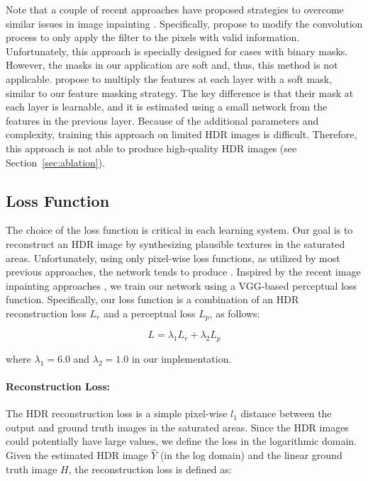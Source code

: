 Note that a couple of recent approaches have proposed strategies to overcome similar issues in image inpainting \cite{yu2018free, liu2018image}. Specifically, \citet{liu2018image} propose to modify the convolution process to only apply the filter to the pixels with valid information. Unfortunately, this approach is specially designed for cases with binary masks. However, the masks in our application are soft and, thus, this method is not applicable. \citet{yu2018free} propose to multiply the features at each layer with a soft mask, similar to our feature masking strategy. The key difference is that their mask at each layer is learnable, and it is estimated using a small network from the features in the previous layer. Because of the additional parameters and complexity, training this approach on limited HDR images is difficult. Therefore, this approach is not able to produce high-quality HDR images (see Section~\ref{sec:ablation}).

\subsection{Loss Function}
\label{sec:hybridloss}

The choice of the loss function is critical in each learning system. Our goal is to reconstruct an HDR image by synthesizing plausible textures in the saturated areas. Unfortunately, using only pixel-wise loss functions, as utilized by most previous approaches, the network tends to produce . Inspired by the recent image inpainting approaches \cite{yang2017high, liu2018image, han2019finet}, we train our network using a VGG-based perceptual loss function. Specifically, our loss function is a combination of an HDR reconstruction loss $ {L}_{r} $ and a perceptual loss $ {L}_{p} $, as follows:

\vspace{-6pt}
\begin{equation}
    \label{eqn:fullloss}
      L = {\lambda}_1 {L}_{r} + {\lambda}_2 {L}_{p}
\end{equation}
\vspace{-10pt}

\noindent where $ {\lambda}_1 = 6.0$ and ${\lambda}_2 = 1.0$ in our implementation. 
\paragraph{Reconstruction Loss:} The HDR reconstruction loss is a simple pixel-wise $l_1$ distance between the output and ground truth images in the saturated areas. Since the HDR images could potentially have large values, we define the loss in the logarithmic domain. Given the estimated HDR image $\hat{Y}$ (in the log domain) and the  linear ground truth image $H$, the reconstruction loss is defined as:

